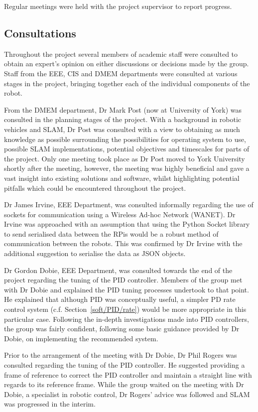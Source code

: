 Regular meetings were held with the project supervisor to report progress.

\subsection{Consultations}\label{pm/consultations}
Throughout the project several members of academic staff
were consulted to obtain an expert's opinion on either
discussions or decisions made by the group.
Staff from the EEE, CIS and DMEM departments were
consulted at various stages in the project, bringing together
each of the individual components of the robot.

From the DMEM department, Dr Mark Post (now at University of York)
was consulted in the planning stages of the project. With a
background in robotic vehicles and SLAM, Dr Post was consulted
with a view to obtaining as much knowledge as possible
surrounding the possibilities for operating system to use,
possible SLAM implementations, potential objectives and
timescales for parts of the project. Only one meeting took place
as Dr Post moved to York University shortly after the meeting,
however, the meeting was highly beneficial and gave a vast
insight into existing solutions and software, whilst highlighting
potential pitfalls which could be encountered throughout
the project.

Dr James Irvine, EEE Department, was consulted informally
regarding the use of sockets for communication using a Wireless
Ad-hoc Network (WANET). Dr Irvine was approached with an
assumption that using the Python Socket library to send
serialised data between the RPis would be a robust
method of communication between the robots. This was confirmed
by Dr Irvine with the additional suggestion to serialise the data
as JSON objects.


Dr Gordon Dobie, EEE Department, was consulted towards the end
of the project regarding the tuning of the PID controller.
Members of the group met with Dr Dobie and explained the PID tuning
processes undertook to that point. He explained that although
PID was conceptually useful, a simpler PD rate control system (c.f. Section~\ref{soft/PID/rate}) would be more appropriate
in this particular case. Following the in-depth investigations made
into PID controllers, the group was fairly confident, following some
basic guidance provided by Dr Dobie, on implementing the
recommended system.

Prior to the arrangement of the meeting with Dr Dobie, Dr Phil
Rogers was consulted regarding the tuning of the PID controller.
He suggested providing a frame of reference to correct
the PID controller and maintain a straight line with regards to
its reference frame. While the group waited on the meeting with
Dr Dobie, a specialist in robotic control, Dr Rogers' advice was
followed and SLAM was progressed in the interim.

